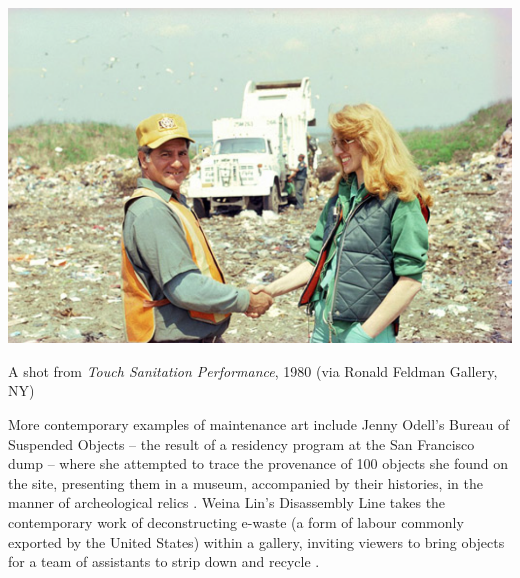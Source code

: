 \documentclass[nofonts,nols,justified,nobib]{tufte-book}
\begin{document}
\begin{marginfigure}
\includegraphics[width=\textwidth]{img/1/touch-sanitation.png}
\caption{A shot from \emph{Touch Sanitation Performance}, 1980 (via Ronald Feldman Gallery, NY)}
\end{marginfigure}

More contemporary examples of maintenance art include Jenny Odell's Bureau of Suspended Objects --  the result of a residency program at the San Francisco dump -- where she attempted to trace the provenance of 100 objects she found on the site, presenting them in a museum, accompanied by their histories, in the manner of archeological relics \cite{odell_archive_2015}. Weina Lin's Disassembly Line takes the contemporary work of deconstructing e-waste (a form of labour commonly exported by the United States) within a gallery, inviting viewers to bring objects for a team of assistants to strip down and recycle \cite{lin_disassembly_2016}.
\end{document}
